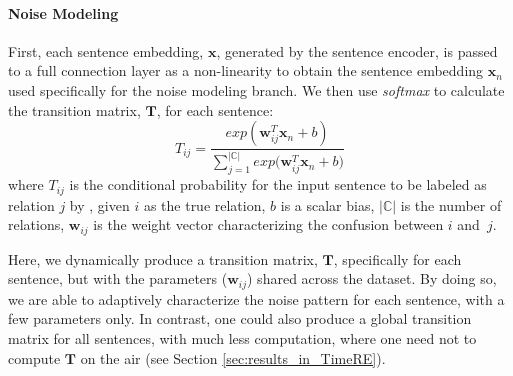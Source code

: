 \paragraph{Noise Modeling}
%
First, each sentence embedding, $\mathbf{x}$,
generated by the sentence encoder, is passed to a full connection layer as a  non-linearity to obtain the
sentence embedding $\mathbf{x}_n$ used specifically for the noise modeling
branch.
We then use \emph{softmax} to calculate the transition matrix, $\mathbf{T}$, for each sentence:
%
\begin{equation}\label{eq_tm}
T_{ij} = \frac{exp({\mathbf{w}_{ij}^T \mathbf{x}_n + b})}{\sum_{j=1}^{|\mathbb{C}|}{exp({\mathbf{w}_{ij}^T \mathbf{x}_n + b}})}
\end{equation}
where $T_{ij}$ is the conditional probability for the input sentence to be labeled as relation $j$ by \DS, given $i$ as the true relation, $b$ is a scalar bias,  $|\mathbb{C}|$ is the number of relations, $\mathbf{w}_{ij}$ is the weight vector characterizing the confusion between $i$ and~$j$. %

Here, we dynamically produce a transition matrix, $\mathbf{T}$, specifically for each sentence, but with the parameters ($\mathbf{w}_{ij}$) shared across the dataset. By doing so, we are able to adaptively characterize the noise pattern for each sentence, with a few parameters only. In contrast, one could also produce a global transition matrix for all sentences, with much less computation, where one need not to compute $\mathbf{T}$ on the air (see Section \ref{sec:results_in_TimeRE}).


